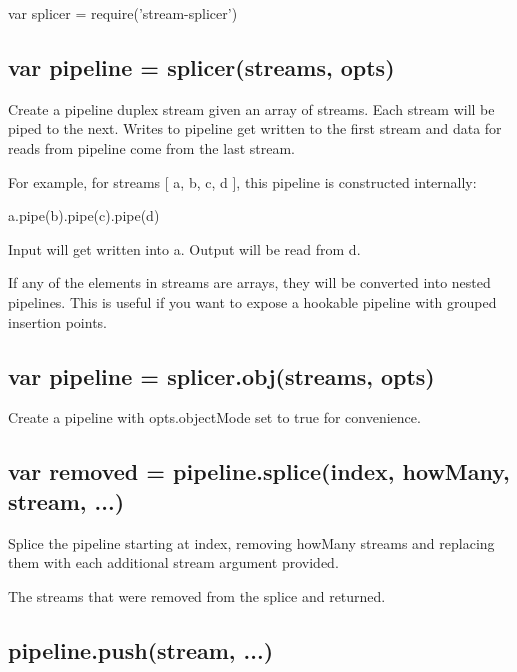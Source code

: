 \begin{DoxyCode}
var splicer = require('stream-splicer')
\end{DoxyCode}


\subsection*{var pipeline = splicer(streams, opts)}

Create a {\ttfamily pipeline} duplex stream given an array of {\ttfamily streams}. Each {\ttfamily stream} will be piped to the next. Writes to {\ttfamily pipeline} get written to the first stream and data for reads from {\ttfamily pipeline} come from the last stream.

For example, for streams {\ttfamily \mbox{[} a, b, c, d \mbox{]}}, this pipeline is constructed internally\+:


\begin{DoxyCode}
a.pipe(b).pipe(c).pipe(d)
\end{DoxyCode}


Input will get written into {\ttfamily a}. Output will be read from {\ttfamily d}.

If any of the elements in {\ttfamily streams} are arrays, they will be converted into nested pipelines. This is useful if you want to expose a hookable pipeline with grouped insertion points.

\subsection*{var pipeline = splicer.\+obj(streams, opts)}

Create a {\ttfamily pipeline} with {\ttfamily opts.\+object\+Mode} set to true for convenience.

\subsection*{var removed = pipeline.\+splice(index, how\+Many, stream, ...)}

Splice the pipeline starting at {\ttfamily index}, removing {\ttfamily how\+Many} streams and replacing them with each additional {\ttfamily stream} argument provided.

The streams that were removed from the splice and returned.

\subsection*{pipeline.\+push(stream, ...)}

